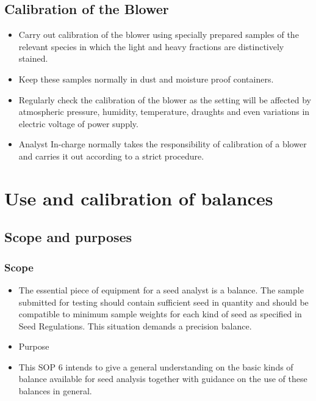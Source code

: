 \documentclass[]{book}
\providecommand{\tightlist}{%
  \setlength{\itemsep}{0pt}\setlength{\parskip}{0pt}}
\begin{document}
\section{Calibration of the Blower}\label{calibration-of-the-blower}

\begin{itemize}
\tightlist
\item
  Carry out calibration of the blower using specially prepared samples
  of the relevant species in which the light and heavy fractions are
  distinctively stained.
\item
  Keep these samples normally in dust and moisture proof containers.
\item
  Regularly check the calibration of the blower as the setting will be
  affected by atmospheric pressure, humidity, temperature, draughts and
  even variations in electric voltage of power supply.
\item
  Analyst In-charge normally takes the responsibility of calibration of
  a blower and carries it out according to a strict procedure.
\end{itemize}

\chapter{Use and calibration of
balances}\label{use-and-calibration-of-balances}

\section{Scope and purposes}\label{scope-and-purposes-1}

\subsection{Scope}\label{scope-2}

\begin{itemize}
\tightlist
\item
  The essential piece of equipment for a seed analyst is a balance. The
  sample submitted for testing should contain sufficient seed in
  quantity and should be compatible to minimum sample weights for each
  kind of seed as specified in Seed Regulations. This situation demands
  a precision balance.
\item
  Purpose
\item
  This SOP 6 intends to give a general understanding on the basic kinds
  of balance available for seed analysis together with guidance on the
  use of these balances in general.
\end{itemize}
\end{document}
